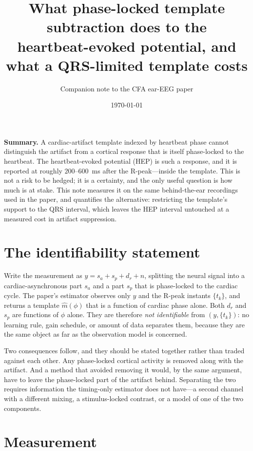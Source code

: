 \documentclass[11pt]{article}
\title{\vspace{-2em}\bfseries What phase-locked template subtraction does to the\\
heartbeat-evoked potential, and what a QRS-limited template costs}
\author{Companion note to the CFA ear-EEG paper}
\date{\today}
\newcommand{\mhat}{\widehat{m}}
\begin{document}
\maketitle
\vspace{-1.5em}

\noindent
\textbf{Summary.} A cardiac-artifact template indexed by heartbeat phase cannot distinguish the
artifact from a cortical response that is itself phase-locked to the heartbeat. The
heartbeat-evoked potential (HEP) is such a response, and it is reported at roughly $200$--$600$~ms
after the R-peak---inside the template. This is not a risk to be hedged; it is a certainty, and the
only useful question is how much is at stake. This note measures it on the same behind-the-ear
recordings used in the paper, and quantifies the alternative: restricting the template's support to
the QRS interval, which leaves the HEP interval untouched at a measured cost in artifact
suppression.

\section{The identifiability statement}

Write the measurement as $y = s_a + s_p + d_r + n$, splitting the neural signal into a
cardiac-asynchronous part $s_a$ and a part $s_p$ that is phase-locked to the cardiac cycle. The
paper's estimator observes only $y$ and the R-peak instants $\{t_k\}$, and returns a template
$\mhat(\phi)$ that is a function of cardiac phase alone. Both $d_r$ and $s_p$ are functions of
$\phi$ alone. They are therefore \emph{not identifiable} from $(y,\{t_k\})$: no learning rule, gain
schedule, or amount of data separates them, because they are the same object as far as the
observation model is concerned.

Two consequences follow, and they should be stated together rather than traded against each other.
Any phase-locked cortical activity is removed along with the artifact. And a method that avoided
removing it would, by the same argument, have to leave the phase-locked part of the artifact behind.
Separating the two requires information the timing-only estimator does not have---a second channel
with a different mixing, a stimulus-locked contrast, or a model of one of the two components.

\section{Measurement}
\end{document}
